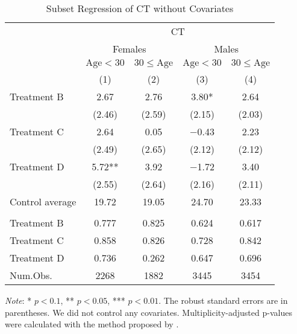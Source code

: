 \documentclass[12pt, a4paper]{article}
\begin{document}
\begin{table}[H]

\caption{\label{tab:test-lm-subset1}Subset Regression of CT without Covariates}
\centering
\fontsize{8}{10}\selectfont
\begin{threeparttable}
\begin{tabular}[t]{lcccc}
\toprule
\multicolumn{1}{c}{ } & \multicolumn{4}{c}{CT} \\
\cmidrule(l{3pt}r{3pt}){2-5}
\multicolumn{1}{c}{ } & \multicolumn{2}{c}{Females} & \multicolumn{2}{c}{Males} \\
\cmidrule(l{3pt}r{3pt}){2-3} \cmidrule(l{3pt}r{3pt}){4-5}
\multicolumn{1}{c}{ } & \multicolumn{1}{c}{$\text{Age} < 30$} & \multicolumn{1}{c}{$30 \le \text{Age}$} & \multicolumn{1}{c}{$\text{Age} < 30$} & \multicolumn{1}{c}{$30 \le \text{Age}$} \\
\cmidrule(l{3pt}r{3pt}){2-2} \cmidrule(l{3pt}r{3pt}){3-3} \cmidrule(l{3pt}r{3pt}){4-4} \cmidrule(l{3pt}r{3pt}){5-5}
  & (1) & (2) & (3) & (4)\\
\midrule
Treatment B & \num{2.67} & \num{2.76} & \num{3.80}* & \num{2.64}\\
 & (\num{2.46}) & (\num{2.59}) & (\num{2.15}) & (\num{2.03})\\
Treatment C & \num{2.64} & \num{0.05} & \num{-0.43} & \num{2.23}\\
 & (\num{2.49}) & (\num{2.65}) & (\num{2.12}) & (\num{2.12})\\
Treatment D & \num{5.72}** & \num{3.92} & \num{-1.72} & \num{3.40}\\
 & (\num{2.55}) & (\num{2.64}) & (\num{2.16}) & (\num{2.11})\\
\midrule
Control average & 19.72 & 19.05 & 24.70 & 23.33\\
\addlinespace[0.3em]
\multicolumn{5}{l}{\textit{Multiplicity-adjusted p-values}}\\
\hspace{1em}Treatment B & 0.777 & 0.825 & 0.624 & 0.617\\
\hspace{1em}Treatment C & 0.858 & 0.826 & 0.728 & 0.842\\
\hspace{1em}Treatment D & 0.736 & 0.262 & 0.647 & 0.696\\
Num.Obs. & \num{2268} & \num{1882} & \num{3445} & \num{3454}\\
\bottomrule
\end{tabular}
\begin{tablenotes}
\item \emph{Note}: * $p < 0.1$, ** $p < 0.05$, *** $p < 0.01$. The robust standard errors are in parentheses. We did not control any covariates. Multiplicity-adjusted p-values were calculated with the method proposed by \cite{List2019}.
\end{tablenotes}
\end{threeparttable}
\end{table}
\end{document}
